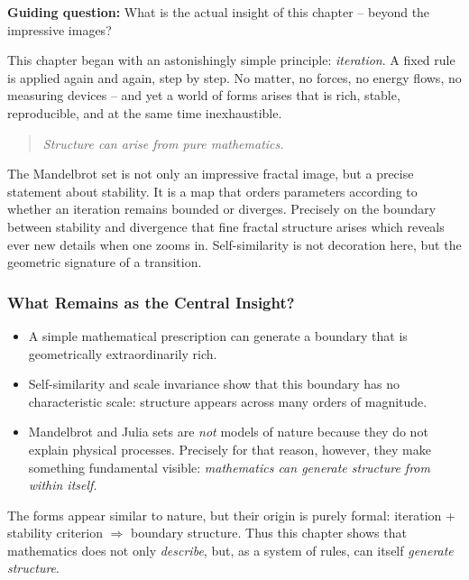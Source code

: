 \textbf{Guiding question:} What is the actual insight of this chapter -- beyond the impressive images?

This chapter began with an astonishingly simple principle:
\emph{iteration}.
A fixed rule is applied again and again, step by step.
No matter, no forces, no energy flows, no measuring devices --
and yet a world of forms arises
that is rich, stable, reproducible,
and at the same time inexhaustible.

\begin{quote}
	\emph{Structure can arise from pure mathematics.}
\end{quote}

The Mandelbrot set is not only an impressive fractal image,
but a precise statement about stability.
It is a map
that orders parameters according to whether
an iteration remains bounded or diverges.
Precisely on the boundary between stability and divergence
that fine fractal structure arises
which reveals ever new details when one zooms in.
Self-similarity is not decoration here,
but the geometric signature of a transition.

\subsubsection*{What Remains as the Central Insight?}

\begin{itemize}
	\item A simple mathematical prescription can generate a boundary that is geometrically extraordinarily rich.
	\item Self-similarity and scale invariance show that this boundary has no characteristic scale:
	structure appears across many orders of magnitude.
	\item Mandelbrot and Julia sets are \emph{not} models of nature because they do not explain physical processes.
	Precisely for that reason, however, they make something fundamental visible:
	\emph{mathematics can generate structure from within itself.}
\end{itemize}

\begin{NoteBox}
	\label{box:corestatement}
	\small
	The forms appear similar to nature,
	but their origin is purely formal:
	iteration + stability criterion \(\Rightarrow\) boundary structure.
	Thus this chapter shows
	that mathematics does not only \emph{describe},
	but, as a system of rules, can itself \emph{generate structure}.
\end{NoteBox}

